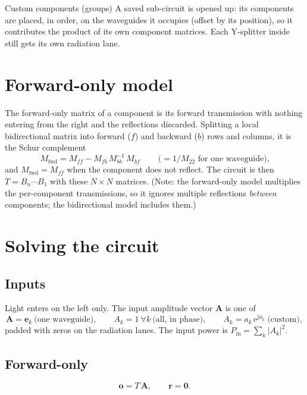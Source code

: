 \documentclass[10pt,a4paper]{article}
\newcommand{\jj}{\mathrm{j}}
\newcommand{\e}{\mathrm{e}}
\begin{document}
\begin{comp}{Custom components (groups)}
A saved sub-circuit is opened up: its components are placed, in order, on the waveguides it occupies (offset by its position),
so it contributes the product of its own component matrices. Each Y-splitter inside still gets its own radiation lane.
\end{comp}

\section{Forward-only model}
The forward-only matrix of a component is its forward transmission with nothing entering from the right and the reflections
discarded. Splitting a local bidirectional matrix into forward ($f$) and backward ($b$) rows and columns, it is the Schur complement
\[
  \boxed{\,M_{\text{fwd}} = M_{ff} - M_{fb}\,M_{bb}^{-1}\,M_{bf}\,}
  \qquad\bigl(= 1/M_{22} \text{ for one waveguide}\bigr),
\]
and $M_{\text{fwd}} = M_{ff}$ when the component does not reflect. The circuit is then $T = B_n\cdots B_1$ with these
$N\times N$ matrices. (Note: the forward-only model multiplies the per-component transmissions, so it ignores multiple
reflections \emph{between} components; the bidirectional model includes them.)

\section{Solving the circuit}

\subsection{Inputs}
Light enters on the left only. The input amplitude vector $\mathbf{A}$ is one of
\[
  \mathbf{A} = \mathbf{e}_k \ \text{(one waveguide)},\qquad
  A_k = 1\ \forall k\ \text{(all, in phase)},\qquad
  A_k = a_k\,\e^{\jj\phi_k}\ \text{(custom)},
\]
padded with zeros on the radiation lanes. The input power is $P_{\text{in}} = \sum_k |A_k|^2$.

\subsection{Forward-only}
\[
  \mathbf{o} = T\,\mathbf{A},\qquad \mathbf{r} = \mathbf{0}.
\]
\end{document}
